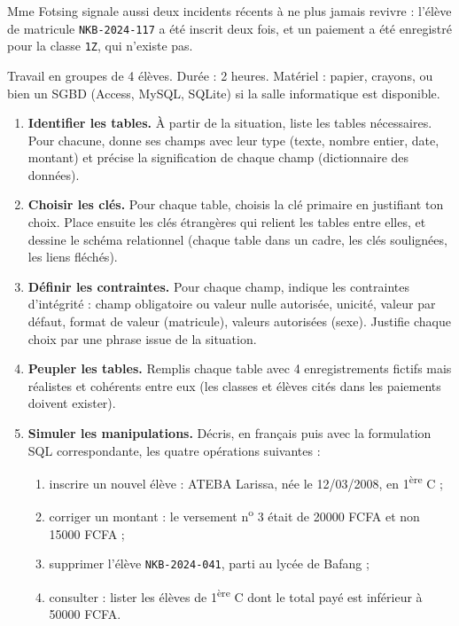 \documentclass[11pt]{article}
\newcounter{popsec}
\newcounter{popsub}
\newcommand{\courssub}[1]{%
  \stepcounter{popsub}%
  \par\vspace{9pt}\noindent{\popxbold\fontsize{11.5}{13}\selectfont\color{popink}{\color{poporange}\thepopsec.\thepopsub}\hspace{6pt}#1}\par\nopagebreak\vspace{4pt}
}
\begin{document}
Mme Fotsing signale aussi deux incidents récents à ne plus jamais revivre : l'élève de matricule \texttt{NKB-2024-117} a été inscrit deux fois, et un paiement a été enregistré pour la classe \texttt{1Z}, qui n'existe pas.

\courssub{Consignes}

Travail en groupes de 4 élèves. Durée : 2 heures. Matériel : papier, crayons, ou bien un SGBD (Access, MySQL, SQLite) si la salle informatique est disponible.

\begin{enumerate}
\item \textbf{Identifier les tables.} À partir de la situation, liste les tables nécessaires. Pour chacune, donne ses champs avec leur type (texte, nombre entier, date, montant) et précise la signification de chaque champ (dictionnaire des données).
\item \textbf{Choisir les clés.} Pour chaque table, choisis la clé primaire en justifiant ton choix. Place ensuite les clés étrangères qui relient les tables entre elles, et dessine le schéma relationnel (chaque table dans un cadre, les clés soulignées, les liens fléchés).
\item \textbf{Définir les contraintes.} Pour chaque champ, indique les contraintes d'intégrité : champ obligatoire ou valeur nulle autorisée, unicité, valeur par défaut, format de valeur (matricule), valeurs autorisées (sexe). Justifie chaque choix par une phrase issue de la situation.
\item \textbf{Peupler les tables.} Remplis chaque table avec 4 enregistrements fictifs mais réalistes et cohérents entre eux (les classes et élèves cités dans les paiements doivent exister).
\item \textbf{Simuler les manipulations.} Décris, en français puis avec la formulation SQL correspondante, les quatre opérations suivantes :
\begin{enumerate}
\item inscrire un nouvel élève : ATEBA Larissa, née le 12/03/2008, en 1\textsuperscript{ère} C ;
\item corriger un montant : le versement n\textsuperscript{o} 3 était de \num{20000} FCFA et non \num{15000} FCFA ;
\item supprimer l'élève \texttt{NKB-2024-041}, parti au lycée de Bafang ;
\item consulter : lister les élèves de 1\textsuperscript{ère} C dont le total payé est inférieur à \num{50000} FCFA.
\end{enumerate}

\end{enumerate}
\end{document}
